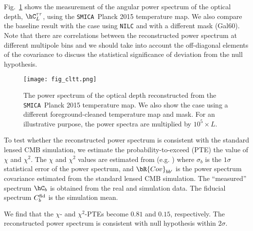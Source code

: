 \documentclass[aps,prd,twocolumn,superscriptaddress,groupedaddress,nofootinbib]{revtex4}
\def\SMICA{{\tt SMICA}}
\begin{document}
Fig.~\ref{fig:cltt} shows the measurement of the angular power spectrum of the optical depth, 
$\hC_L^{\tau\tau}$, using the \SMICA\ Planck 2015 temperature map. 
We also compare the baseline result with the case using {\tt NILC} and with a different mask (Gal60). 
Note that there are correlations between the reconstructed power spectrum at different multipole bins and 
we should take into account the off-diagonal elements of the covariance to discuss the statistical 
significance of deviation from the null hypothesis.

\begin{figure}[t]
\bc
\texttt{[image: fig\_cltt.png]} 
\caption{
The power spectrum of the optical depth reconstructed from the \SMICA\ Planck 2015 temperature map. 
We also show the case using a different foreground-cleaned temperature map and mask. 
For an illustrative purpose, the power spectra are multiplied by $10^5\times L$. 
}
\label{fig:cltt}
\ec
\end{figure}

To test whether the reconstructed power spectrum is consistent with the standard lensed CMB simulation, 
we estimate the probability-to-exceed (PTE) the value of $\chi$ and $\chi^2$.
The $\chi$ and $\chi^2$ values are estimated from (e.g. \cite{B2I})
where $\sigma_b$ is the $1\sigma$ statistical error of the power spectrum, and
$\bR{Cov}_{bb'}$ is the power spectrum covariance estimated from the standard lensed CMB simulation. 
The ``measured'' spectrum $\hC_b$ is obtained from the real and simulation data. 
The fiducial spectrum $C_b^{\rm fid}$ is the simulation mean. 

We find that the $\chi$- and $\chi^2$-PTEs become $0.81$ and $0.15$, respectively. 
The reconstructed power spectrum is consistent with null hypothesis within $2\sigma$. 
\end{document}
